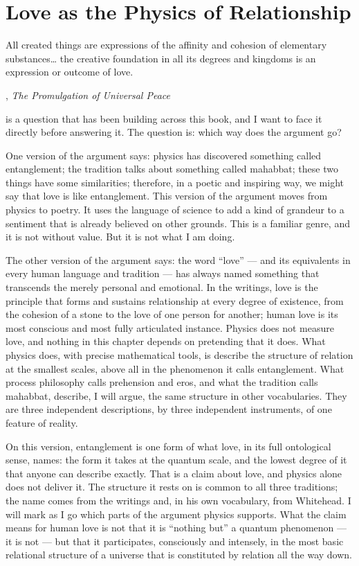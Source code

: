 \chapter{Love as the Physics of Relationship}
\label{ch:love-physics}

\epigraph{All created things are expressions of the affinity and cohesion of
  elementary substances\ldots{} the creative foundation in all its degrees
  and kingdoms is an expression or outcome of love.}{\AbdulBaha,
  \textit{The Promulgation of Universal Peace}}

 is a question that has been building across this book, and I want to face it directly before answering it.
The question is: which way does the argument go?

One version of the argument says: physics has discovered something called entanglement; the \bahai tradition talks about something called mahabbat; these two things have some similarities; therefore, in a poetic and inspiring way, we might say that love is like entanglement. This version of the argument moves from physics to poetry. It uses the language of science to add a kind of grandeur to a sentiment that is already believed on other grounds. This is a familiar genre, and it is not without value. But it is not what I am doing.

The other version of the argument says: the word ``love'' — and its equivalents in every human language and tradition — has always named something that transcends the merely personal and emotional. In the \bahai writings, love is the principle that forms and sustains relationship at every degree of existence, from the cohesion of a stone to the love of one person for another; human love is its most conscious and most fully articulated instance. Physics does not measure love, and nothing in this chapter depends on pretending that it does. What physics does, with precise mathematical tools, is describe the structure of relation at the smallest scales, above all in the phenomenon it calls entanglement. What process philosophy calls prehension and eros, and what the \bahai tradition calls mahabbat, describe, I will argue, the same structure in other vocabularies. They are three independent descriptions, by three independent instruments, of one feature of reality.

On this version, entanglement is one form of what love, in its full ontological sense, names: the form it takes at the quantum scale, and the lowest degree of it that anyone can describe exactly. That is a claim about love, and physics alone does not deliver it. The structure it rests on is common to all three traditions; the name comes from the \bahai writings and, in his own vocabulary, from Whitehead. I will mark as I go which parts of the argument physics supports. What the claim means for human love is not that it is ``nothing but'' a quantum phenomenon — it is not — but that it participates, consciously and intensely, in the most basic relational structure of a universe that is constituted by relation all the way down.


